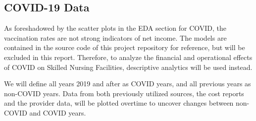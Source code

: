\documentclass{article}
\theoremstyle{mytheoremstyle}
\theoremstyle{mytheoremstyle}
\theoremstyle{myproblemstyle}
\begin{document}
\pagebreak

\subsection{COVID-19 Data}
As foreshadowed by the scatter plots in the EDA section for COVID, the vaccination rates are not strong indicators of net income. The models are contained in the source code of  this project repository for reference, but will be excluded in this report. Therefore, to analyze the financial and operational effects of COVID on Skilled Nursing Facilities, descriptive analytics will be used instead. 

We will define all years 2019 and after as COVID years, and all previous years as non-COVID years. Data from both previously utilized sources, the cost reports and the provider data, will be plotted overtime to uncover changes between non-COVID and COVID years.
\end{document}
